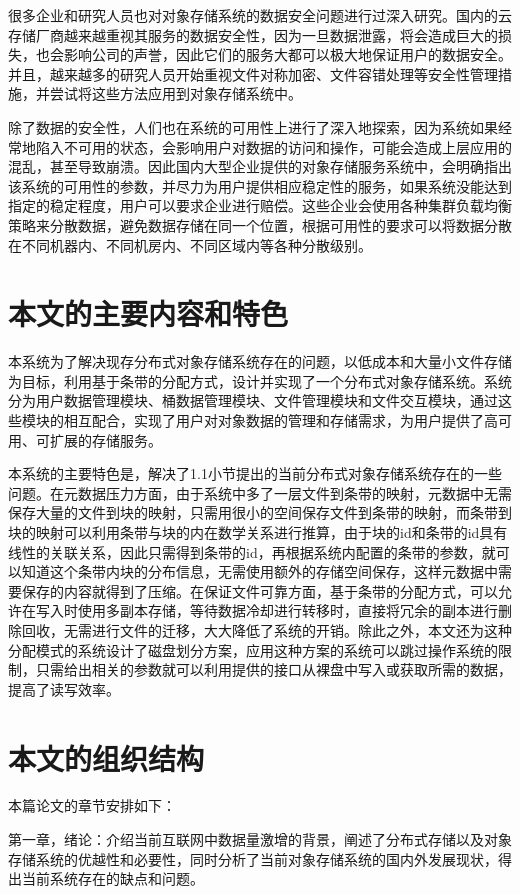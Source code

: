 很多企业和研究人员也对对象存储系统的数据安全问题进行过深入研究。国内的云存储厂商越来越重视其服务的数据安全性，因为一旦数据泄露，将会造成巨大的损失，也会影响公司的声誉，因此它们的服务大都可以极大地保证用户的数据安全。并且，越来越多的研究人员开始重视文件对称加密\cite{32}、文件容错处理等安全性管理措施，并尝试将这些方法应用到对象存储系统中。

除了数据的安全性，人们也在系统的可用性上进行了深入地探索，因为系统如果经常地陷入不可用的状态，会影响用户对数据的访问和操作，可能会造成上层应用的混乱，甚至导致崩溃。因此国内大型企业提供的对象存储服务系统中，会明确指出该系统的可用性的参数，并尽力为用户提供相应稳定性的服务，如果系统没能达到指定的稳定程度，用户可以要求企业进行赔偿。这些企业会使用各种集群负载均衡策略来分散数据，避免数据存储在同一个位置，根据可用性的要求可以将数据分散在不同机器内、不同机房内、不同区域内等各种分散级别。

\section{本文的主要内容和特色}%
本系统为了解决现存分布式对象存储系统存在的问题，以低成本和大量小文件存储为目标，利用基于条带的分配方式，设计并实现了一个分布式对象存储系统。系统分为用户数据管理模块、桶数据管理模块、文件管理模块和文件交互模块，通过这些模块的相互配合，实现了用户对对象数据的管理和存储需求，为用户提供了高可用、可扩展的存储服务。

本系统的主要特色是，解决了1.1小节提出的当前分布式对象存储系统存在的一些问题。在元数据压力方面，由于系统中多了一层文件到条带的映射，元数据中无需保存大量的文件到块的映射，只需用很小的空间保存文件到条带的映射，而条带到块的映射可以利用条带与块的内在数学关系进行推算，由于块的id和条带的id具有线性的关联关系，因此只需得到条带的id，再根据系统内配置的条带的参数，就可以知道这个条带内块的分布信息，无需使用额外的存储空间保存，这样元数据中需要保存的内容就得到了压缩。在保证文件可靠方面，基于条带的分配方式，可以允许在写入时使用多副本存储，等待数据冷却进行转移时，直接将冗余的副本进行删除回收，无需进行文件的迁移，大大降低了系统的开销。除此之外，本文还为这种分配模式的系统设计了磁盘划分方案，应用这种方案的系统可以跳过操作系统的限制，只需给出相关的参数就可以利用提供的接口从裸盘中写入或获取所需的数据，提高了读写效率。

\section{本文的组织结构}%
本篇论文的章节安排如下：

第一章，绪论：介绍当前互联网中数据量激增的背景，阐述了分布式存储以及对象存储系统的优越性和必要性，同时分析了当前对象存储系统的国内外发展现状，得出当前系统存在的缺点和问题。

